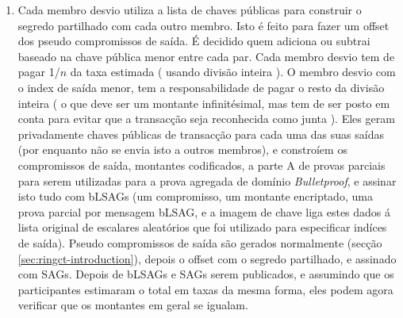 \begin{enumerate}
\footnote{Transacções de TxTangle não deviam ter informação adicional no campo {\em extra} (e.g. nenhum ID de pagamento, a não ser que seja um TxTangle com só duas saídas, que deve ter pelo menos um ID de pagamento desvio encriptado) }
\footnote{A estimação da taxa devia ser baseada numa abordagem standard, assim cada participante calcula a mesma coisa. De outra forma as saídas podem ser agrupadas com base no método do cálculo da taxa. Este standard da taxa devia ser implementado fora de TxTangle, para promover que transacções de TxTangle se parecam iguais a transacções normais.} 
    \item Cada membro desvio utiliza a lista de chaves públicas para construir o segredo partilhado com cada outro membro. Isto é feito para fazer um offset dos pseudo compromissos de saída. É decidido quem adiciona ou subtrai baseado na chave pública menor entre cada par.
\newline Cada membro desvio tem de pagar 1/$n$ da taxa estimada ( usando divisão inteira ). O membro desvio com o index de saída menor, tem a responsabilidade de pagar o resto da divisão inteira ( o que deve ser um montante infinitésimal, mas tem de ser posto em conta para evitar que a transacção seja reconhecida como junta ).
\newline Eles geram privadamente chaves públicas de transacção para cada uma das suas saídas (por enquanto não se envia isto a outros membros), e constroíem os compromissos de saída, montantes codificados, a parte A de provas parciais para serem utilizadas para a prova agregada de domínio {\em Bulletproof}, e assinar isto tudo com bLSAGs (um compromisso, um montante encriptado, uma prova parcial por mensagem bLSAG, e a imagem de chave liga estes dados á lista original de escalares aleatórios que foi utilizado para especificar indíces de saída). Pseudo compromissos de saída são gerados normalmente (secção \ref{sec:ringct-introduction}), depois o offset com o segredo partilhado, e assinado com SAGs. Depois de bLSAGs e SAGs serem publicados, e assumindo que os participantes estimaram o total em taxas da mesma forma, eles podem agora verificar que os montantes em geral se igualam.           

\end{enumerate}
